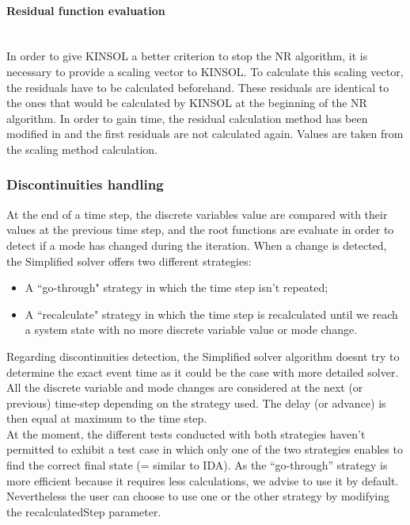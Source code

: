 \documentclass[a4paper, 12pt]{report}
\begin{document}
\paragraph{Residual function evaluation}
~~\\

In order to give \ac{KINSOL} a better criterion to stop the \ac{NR} algorithm, it is necessary to provide a scaling vector to \ac{KINSOL}. To calculate this scaling vector, the residuals have to be calculated beforehand. These residuals are identical to the ones that would be calculated by \ac{KINSOL} at the beginning of the \ac{NR} algorithm. In order to gain time, the residual calculation method has been modified in \Dynawo  and the first residuals are not calculated again. Values are taken from the scaling method calculation.

\subsubsection{Discontinuities handling}

At the end of a time step, the discrete variables value are compared with their values at the previous time step, and the root functions are evaluate in order to detect if a mode has changed during the iteration. When a change is detected, the Simplified solver offers two different strategies:
\begin{itemize}
\item A ``go-through" strategy in which the time step isn't repeated;
\item A ``recalculate" strategy in which the time step is recalculated until we reach a system state with no more discrete variable value or mode change.
\end{itemize}

Regarding discontinuities detection, the Simplified solver algorithm doesn\textquotesingle t try to determine the exact event time as it could be the case with more detailed solver. All the discrete variable and mode changes are considered at the next (or previous) time-step depending on the strategy used. The delay (or advance) is then equal at maximum to the time step. \\

At the moment, the different tests conducted with both strategies haven't permitted to exhibit a test case in which only one of the two strategies enables to find the correct final state (= similar to IDA). As the ``go-through'' strategy is more efficient because it requires less calculations, we advise to use it by default. Nevertheless the user can choose to use one or the other strategy by modifying the recalculatedStep parameter. \\
\end{document}
